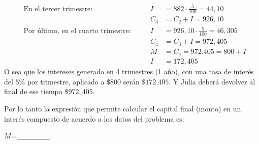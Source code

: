 \documentclass[12pt]{examdesign}
\theoremstyle{plain}
\theoremstyle{definition}
\theoremstyle{remark}
\begin{document}
\begin{endmatter}
\begin{align*}
        	&\mbox{En el tercer trimestre: }               &&&        I&=882\cdot \frac{5}{100}=44,10      \\
        	&                                              &&&      C_3&=C_{2}+I=926,10                    \\
        	&\mbox{Por último, en el cuarto trimestre: }   &&&        I&=926,10 \cdot \frac{5}{100}=46,305 \\
        	&                                              &&&    C_{4}&=C_{3}+I=972,405                   \\
        	&                                              &&&        M&=C_4=972.405=800+I                 \\ 
        	&                                              &&&        I&=172,405
        \end{align*}
        O sea que los intereses generado en 4 trimestres (1 año), con una tasa de interés del $5\%$ por trimestre, aplicado a $\$800$ serán $\$172.405$. Y Julia deberá devolver al final de ese tiempo $\$972,405$.
        
        Por lo tanto la expresión que permite calcular el capital final (monto) en un interés compuesto de acuerdo a los datos del problema es:
        
        \begin{center}
        	\def\blank#1{$\underline{\mbox{\hphantom{#1}}}$}
        	$M$=\blank{woodchuck}
        \end{center}
    \end{endmatter}
\end{document}
